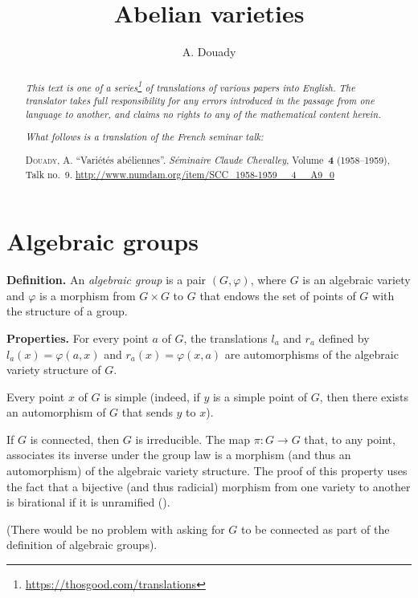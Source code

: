 \documentclass{article}
\title{Abelian varieties}
\author{A. Douady}
\date{}
\newcommand{\doctype}{French seminar talk}
\newcommand{\origcit}{%
  \textsc{Douady, A.}
  ``Vari\'{e}t\'{e}s ab\'{e}liennes''.
  \emph{S\'{e}minaire Claude Chevalley}, Volume~\textbf{4} (1958--1959), Talk no.~9.
  {\url{http://www.numdam.org/item/SCC_1958-1959__4__A9_0}}%
}
\newenvironment{rmenv}[1]
  {\phantomsection\par\medskip\noindent\textbf{#1.}\rmfamily}
  {\medskip}
\newcommand{\oldpage}[1]{\marginpar{\footnotesize$\Big\vert$ \textit{p.~#1}}}
\begin{document}
\maketitle
\thispagestyle{fancy}

\renewcommand{\abstractname}{Translator's note.}

\begin{abstract}
  \renewcommand*{\thefootnote}{\fnsymbol{footnote}}
  \emph{This text is one of a series\footnote{\url{https://thosgood.com/translations}} of translations of various papers into English.}
  \emph{The translator takes full responsibility for any errors introduced in the passage from one language to another, and claims no rights to any of the mathematical content herein.}

  \medskip
  
  \emph{What follows is a translation of the \doctype:}

  \medskip\noindent
  \origcit
\end{abstract}

\setcounter{footnote}{0}

\tableofcontents
\bigskip



\section{Algebraic groups}
\label{1}

\oldpage{9-01}
\begin{rmenv}{Definition}
  An \emph{algebraic group} is a pair $(G,\varphi)$, where $G$ is an algebraic variety and $\varphi$ is a morphism from $G\times G$ to $G$ that endows the set of points of $G$ with the structure of a group.
\end{rmenv}

\begin{rmenv}{Properties}
  For every point $a$ of $G$, the translations $l_a$ and $r_a$ defined by $l_a(x)=\varphi(a,x)$ and $r_a(x)=\varphi(x,a)$ are automorphisms of the algebraic variety structure of $G$.

  Every point $x$ of $G$ is simple (indeed, if $y$ is a simple point of $G$, then there exists an automorphism of $G$ that sends $y$ to $x$).

  If $G$ is connected, then $G$ is irreducible.
  The map $\pi\colon G\to G$ that, to any point, associates its inverse under the group law is a morphism (and thus an automorphism) of the algebraic variety structure.
  The proof of this property uses the fact that a bijective (and thus radicial) morphism from one variety to another is birational if it is unramified (\cite[p.~211, Corollary~2 to Proposition~3, Section~II, Chapter~VI]{1}).

  (There would be no problem with asking for $G$ to be connected as part of the definition of algebraic groups).
\end{rmenv}
\end{document}
